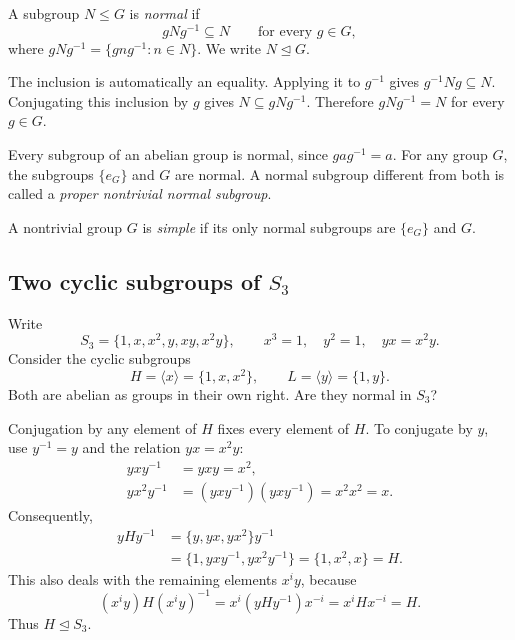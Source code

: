 \documentclass[reqno,11pt]{amsart}
\begin{document}
\begin{define}
A subgroup $N\leq G$ is \emph{normal} if
\begin{equation}
  gNg^{-1}\subseteq N\qquad\text{for every }g\in G,
\end{equation}
where $gNg^{-1}=\{gng^{-1}:n\in N\}$. We write $N\trianglelefteq G$.
\end{define}

\begin{remark}
The inclusion is automatically an equality. Applying it to $g^{-1}$ gives
$g^{-1}Ng\subseteq N$. Conjugating this inclusion by $g$ gives
$N\subseteq gNg^{-1}$. Therefore $gNg^{-1}=N$ for every $g\in G$.
\end{remark}


\begin{example}
Every subgroup of an abelian group is normal, since $gag^{-1}=a$.
For any group $G$, the subgroups $\{e_G\}$ and $G$ are normal.
A normal subgroup different from both is called a \emph{proper nontrivial
normal subgroup}.
\end{example}

\begin{define}
A nontrivial group $G$ is \emph{simple} if its only normal subgroups are
$\{e_G\}$ and $G$.
\end{define}

\subsection*{Two cyclic subgroups of $S_3$}

Write
\[
  S_3=\{1,x,x^2,y,xy,x^2y\},\qquad
  x^3=1,\quad y^2=1,\quad yx=x^2y.
\]
Consider the cyclic subgroups
\[
  H=\langle x\rangle=\{1,x,x^2\},\qquad L=\langle y\rangle=\{1,y\}.
\]
Both are abelian as groups in their own right. Are they normal in $S_3$?

\begin{example}
Conjugation by any element of $H$ fixes every element of $H$.
To conjugate by $y$, use $y^{-1}=y$ and the relation $yx=x^2y$:
\begin{align*}
  yxy^{-1}&=yxy=x^2,\\
  yx^2y^{-1}&=(yxy^{-1})(yxy^{-1})=x^2x^2=x.
\end{align*}
Consequently,
\begin{align*}
  yHy^{-1}
  &=\{y,yx,yx^2\}y^{-1}\\
  &=\{1,yxy^{-1},yx^2y^{-1}\}
   =\{1,x^2,x\}=H.
\end{align*}
This also deals with the remaining elements $x^iy$, because
\[
  (x^iy)H(x^iy)^{-1}=x^i(yHy^{-1})x^{-i}=x^iHx^{-i}=H.
\]
Thus $H\trianglelefteq S_3$.
\end{example}
\end{document}
